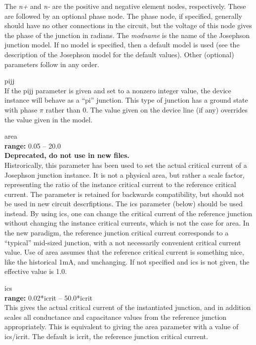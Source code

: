 
The {\it n+} and {\it n-} are the positive and negative element nodes,
respectively.  These are followed by an optional phase node.  The
phase node, if specified, generally should have no other connections
in the circuit, but the voltage of this node gives the phase of the
junction in radians.  The {\it modname} is the name of the Josephson
junction model.  If no model is specified, then a default model is
used (see the description of the Josephson model for the default
values).  Other (optional) parameters follow in any order.

\begin{description}
\item{\vt pijj}\\
If the {\vt pijj} parameter is given and set to a nonzero integer
value, the device instance will behave as a ``pi'' junction.  This
type of junction has a ground state with phase $\pi$ rather than 0. 
The value given on the device line (if any) overrides the value given
in the model.

\item{\vt area}\\
{\bf range:} 0.05 -- 20.0\\
{\bf Deprecated, do not use in new files.}\\
Histrorically, this parameter has been used to set the actual critical
current of a Josephson junction instance.  It is not a physical area,
but rather a scale factor, representing the ratio of the instance
critical current to the reference critical current.  The parameter is
retained for backwards compatibility, but should not be used in new
circuit descrfiptions.  The {\vt ics} parameter (below) should be used
instead.  By using {\vt ics}, one can change the critical current of
the reference junction without changing the instance critical
currents, which is not the case for {\vt area}.  In the new paradigm,
the reference junction critical current corresponds to a ``typical''
mid-sized junction, with a not necessarily convenient critical current
value.  Use of {\vt area} assumes that the reference critical current
is something nice, like the historical 1mA, and unchanging.  If not
specified and {\vt ics} is not given, the effective value is 1.0.

\item{\vt ics}\\
{\bf range:} 0.02*{\vt icrit} -- 50.0*{\vt icrit}\\
This gives the actual critical current of the instantiated junction,
and in addition scales all conductance and capacitance values from the
reference junction appropriately.  This is equivalent to giving the
{\vt area} parameter with a value of {\vt ics}/{\vt icrit}.  The
default is {\vt icrit}, the reference junction critical current.


\end{description}
